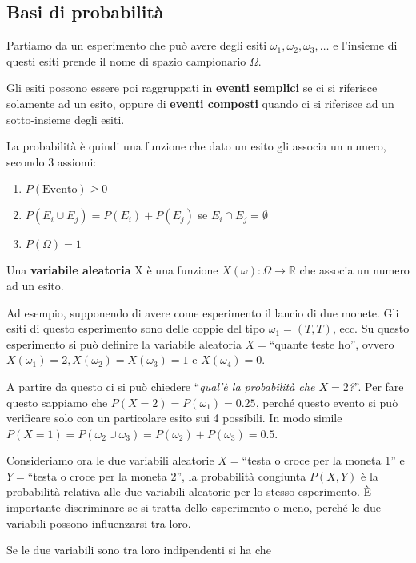 \subsection{Basi di probabilità}

Partiamo da un esperimento che può avere degli esiti $\omega_1, \omega_2, \omega_3, \ldots$ e l'insieme di questi esiti prende il nome di spazio campionario $\Omega$.

Gli esiti possono essere poi raggruppati in \textbf{eventi semplici} se ci si riferisce solamente ad un esito, oppure di \textbf{eventi composti} quando ci si riferisce ad un sotto-insieme degli esiti. 

La probabilità è quindi una funzione che dato un esito gli associa un numero, secondo 3 assiomi:

\begin{enumerate}
	\item $P(\text{Evento}) \geq 0$
	\item $P(E_i \cup E_j) = P(E_i) + P(E_j) $ se $E_i \cap E_j = \emptyset$
	\item $P(\Omega) = 1$
\end{enumerate}

Una \textbf{variabile aleatoria} X è una funzione $X(\omega) : \Omega \rightarrow \mathbb{R}$ che associa un numero ad un esito.

Ad esempio, supponendo di avere come esperimento il lancio di due monete. Gli esiti di questo esperimento sono delle coppie del tipo $\omega_1 = (T,T)$, ecc. Su questo esperimento si può definire la variabile aleatoria $X = $``quante teste ho'', ovvero $X(\omega_1) = 2, X(\omega_2) = X(\omega_3) = 1$ e $X(\omega_4) = 0$.

A partire da questo ci si può chiedere ``\textit{qual'è la probabilità che $X = 2$?}''. Per fare questo sappiamo che $P(X = 2) = P(\omega_1) = 0.25$, perché questo evento si può verificare solo con un particolare esito sui 4 possibili.
In modo simile $P(X = 1) = P(\omega_2 \cup \omega_3) = P(\omega_2) + P(\omega_3) = 0.5$.

Consideriamo ora le due variabili aleatorie $X =$``testa o croce per la moneta 1'' e $Y =$``testa o croce per la moneta 2'', la probabilità congiunta $P(X,Y)$ è la probabilità relativa alle due variabili aleatorie per lo stesso esperimento. \`E importante discriminare se si tratta dello esperimento o meno, perché le due variabili possono influenzarsi tra loro.

Se le due variabili sono tra loro indipendenti si ha che

